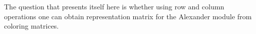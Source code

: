 The question that presents itself here is whether using row and column operations one can obtain representation matrix for the Alexander module from coloring matrices.



%
%
%
%
